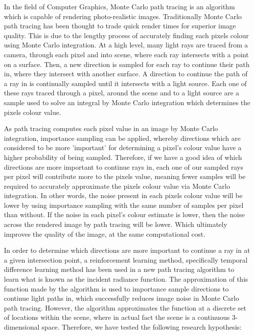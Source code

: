 \documentclass[../dissertation.tex]{subfiles}
\begin{document}
In the field of Computer Graphics, Monte Carlo path tracing is an algorithm which is capable of rendering photo-realistic images. Traditionally Monte Carlo path tracing has been thought to trade quick render times for superior image quality. This is due to the lengthy process of accurately finding each pixels colour using Monte Carlo integration. At a high level, many light rays are traced from a camera, through each pixel and into scene, where each ray intersects with a point on a surface. Then, a new direction is sampled for each ray to continue their path in, where they intersect with another surface. A direction to continue the path of a ray in is continually sampled until it intersects with a light source. Each one of these rays traced through a pixel, around the scene and to a light source are a sample used to solve an integral by Monte Carlo integration which determines the pixels colour value.

As path tracing computes each pixel value in an image by Monte Carlo integration, importance sampling can be applied, whereby directions which are considered to be more 'important' for determining a pixel's colour value have a higher probability of being sampled. Therefore, if we have a good idea of which directions are more important to continue rays in, each one of our sampled rays per pixel will contribute more to the pixels value, meaning fewer samples will be required to accurately approximate the pixels colour value via Monte Carlo integration. In other words, the noise present in each pixels colour value will be lower by using importance sampling with the same number of samples per pixel than without. If the noise in each pixel's colour estimate is lower, then the noise across the rendered image by path tracing will be lower. Which ultimately improves the quality of the image, at the same computational cost.

In order to determine which directions are more important to continue a ray in at a given intersection point, a reinforcement learning method, specifically temporal difference learning method has been used in a new path tracing algorithm to learn what is known as the incident radiance function. The approximation of this function made by the algorithm is used to importance sample directions to continue light paths in, which successfully reduces image noise in Monte Carlo path tracing. However, the algorithm approximates the function at a discrete set of locations within the scene, where in actual fact the scene is a continuous 3-dimensional space. Therefore, we have tested the following research hypothesis:
\end{document}
